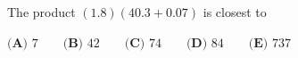 The product $(1.8)(40.3+0.07)$ is closest to

$\textbf{(A) }7\qquad\textbf{(B) }42\qquad\textbf{(C) }74\qquad\textbf{(D) }84\qquad\textbf{(E) }737$
